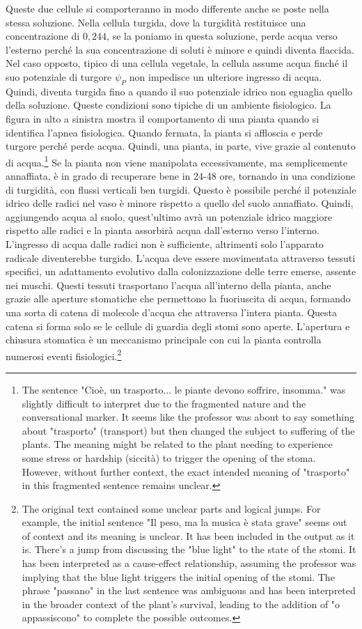 \documentclass[11pt, a4paper]{article}
\begin{document}
\begin{spacing}{1.15}
Queste due cellule si comporteranno in modo differente anche se poste nella stessa soluzione. Nella cellula turgida, dove la turgidità restituisce una concentrazione di $0{,}244$, se la poniamo in questa soluzione, perde acqua verso l'esterno perché la sua concentrazione di soluti è minore e quindi diventa flaccida. Nel caso opposto, tipico di una cellula vegetale, la cellula assume acqua finché il suo potenziale di turgore $\psi_P$ non impedisce un ulteriore ingresso di acqua. Quindi, diventa turgida fino a quando il suo potenziale idrico non eguaglia quello della soluzione. Queste condizioni sono tipiche di un ambiente fisiologico. La figura in alto a sinistra mostra il comportamento di una pianta quando si identifica l'apnea fisiologica. Quando fermata, la pianta si affloscia e perde turgore perché perde acqua. Quindi, una pianta, in parte, vive grazie al contenuto di acqua.\footnote{The sentence "Cioè, un trasporto... le piante devono soffrire, insomma." was slightly difficult to interpret due to the fragmented nature and the conversational marker. It seems like the professor was about to say something about "trasporto" (transport) but then changed the subject to suffering of the plants.  The meaning might be related to the plant needing to experience some stress or hardship (siccità) to trigger the opening of the stoma. However, without further context, the exact intended meaning of "trasporto" in this fragmented sentence remains unclear.}
Se la pianta non viene manipolata eccessivamente, ma semplicemente annaffiata, è in grado di recuperare bene in 24-48 ore, tornando in una condizione di turgidità, con flussi verticali ben turgidi. Questo è possibile perché il potenziale idrico delle radici nel vaso è minore rispetto a quello del suolo annaffiato. Quindi, aggiungendo acqua al suolo, quest'ultimo avrà un potenziale idrico maggiore rispetto alle radici e la pianta assorbirà acqua dall'esterno verso l'interno.  L'ingresso di acqua dalle radici non è sufficiente, altrimenti solo l'apparato radicale diventerebbe turgido. L'acqua deve essere movimentata attraverso tessuti specifici, un adattamento evolutivo dalla colonizzazione delle terre emerse, assente nei muschi. Questi tessuti trasportano l'acqua all'interno della pianta, anche grazie alle aperture stomatiche che permettono la fuoriuscita di acqua, formando una sorta di catena di molecole d'acqua che attraversa l'intera pianta. Questa catena si forma solo se le cellule di guardia degli stomi sono aperte. L'apertura e chiusura stomatica è un meccanismo principale con cui la pianta controlla numerosi eventi fisiologici.\footnote{The original text contained some unclear parts and logical jumps. For example, the initial sentence "Il peso, ma la musica è stata grave" seems out of context and its meaning is unclear. It has been included in the output as it is. There's a jump from discussing the "blue light" to the state of the stomi. It has been interpreted as a cause-effect relationship, assuming the professor was implying that the blue light triggers the initial opening of the stomi. The phrase "passano" in the last sentence was ambiguous and has been interpreted in the broader context of the plant's survival, leading to the addition of "o appassiscono" to complete the possible outcomes.}

\end{spacing}
\end{document}
